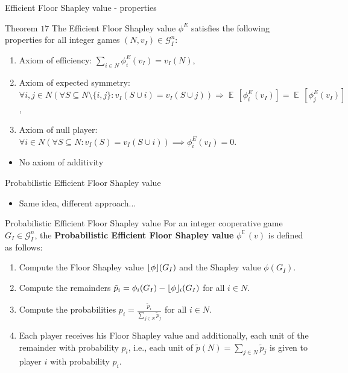 \documentclass{beamer}
\newcommand{\floor}[1]{\left\lfloor #1 \right\rfloor}
\newcommand{\floorphi}{\ensuremath{\floor{\phi}\hspace{-0.5ex}}}
\DeclareMathOperator{\E}{\mathbb{E}\,}
\begin{document}
\begin{frame}{Efficient Floor Shapley value - properties}
    \pause

    \begin{block}{Theorem $17$}
        The Efficient Floor Shapley value $\phi^E$ satisfies the following properties for all integer games $(N,v_I) \in \mathcal{G}_I^n$:
        \begin{enumerate}
            \item Axiom of efficiency: $\sum_{i \in N}\phi_{i}^E(v_I) = v_I(N)$,
            \item Axiom of expected symmetry: $\forall i,j \in N (\forall S \subseteq N \setminus \{i,j\}: v_I(S \cup i) = v_I(S \cup j)) \Rightarrow \E[\phi^E_{i}(v_I)] = \E[\phi^E_{j}(v_I)]$,
            \item Axiom of null player: $\forall i \in N(\forall S \subseteq N: v_I(S)=v_I(S \cup i)) \implies \phi_{i}^E(v_I) = 0$.
        \end{enumerate}
    \end{block}

    \pause

    \begin{itemize}
        \item No axiom of additivity %
    \end{itemize}
\end{frame}



\begin{frame}{Probabilistic Efficient Floor Shapley value}
    \begin{itemize}
        \item Same idea, different approach...
    \end{itemize}

    \pause

    \begin{block}{Probabilistic Efficient Floor Shapley value}
        For an integer cooperative game $G_I \in \mathcal{G}_I^n$, the \textbf{Probabilistic Efficient Floor Shapley value} $\phi^{\E}(v)$ is defined as follows:
        \begin{enumerate}
            \item Compute the Floor Shapley value $\floorphi(G_I)$ and the Shapley value $\phi(G_I)$.
            \item Compute the remainders $\tilde{p}_i = \phi_i(G_I) - \floorphi_i(G_I)$ for all $i \in N$.
            \item Compute the probabilities $p_i = \frac{\tilde{p}_i}{\sum_{j \in N} \tilde{p}_j}$ for all $i \in N$.
            \item Each player receives his Floor Shapley value and additionally, each unit of the remainder with probability $p_i$, i.e., each unit of $\tilde{p}(N)=\sum_{j \in N} \tilde{p}_j$ is given to player $i$ with probability $p_i$.
        \end{enumerate}
    \end{block}
\end{frame}
\end{document}
